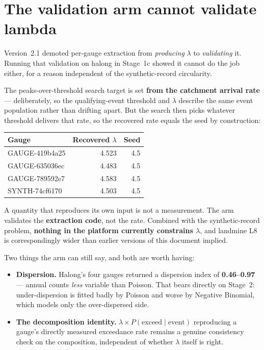 \documentclass[11pt]{article}
\begin{document}
\section{The validation arm cannot validate lambda}
\label{sec:circular2}

Version~2.1 demoted per-gauge extraction from \emph{producing} $\lambda$ to
\emph{validating} it. Running that validation on halong in Stage~1c showed it
cannot do the job either, for a reason independent of the synthetic-record
circularity.

The peaks-over-threshold search target is set \textbf{from the catchment arrival
rate} --- deliberately, so the qualifying-event threshold and $\lambda$ describe
the same event population rather than drifting apart. But the search then picks
whatever threshold delivers that rate, so the recovered rate equals the seed by
construction:

\begin{center}
\begin{tabular}{@{}lrr@{}}
\toprule
\textbf{Gauge} & \textbf{Recovered $\lambda$} & \textbf{Seed} \\
\midrule
GAUGE-419b4a25 & 4.523 & 4.5 \\
GAUGE-635036ec & 4.483 & 4.5 \\
GAUGE-789592e7 & 4.583 & 4.5 \\
SYNTH-74cf6170 & 4.503 & 4.5 \\
\bottomrule
\end{tabular}
\end{center}

\noindent A quantity that reproduces its own input is not a measurement. The arm
validates the \textbf{extraction code}, not the rate. Combined with the
synthetic-record problem, \textbf{nothing in the platform currently constrains
$\lambda$}, and landmine L8 is correspondingly wider than earlier versions of
this document implied.

Two things the arm can still say, and both are worth having:

\begin{itemize}[nosep]
  \item \textbf{Dispersion.} Halong's four gauges returned a dispersion index of
        \textbf{0.46--0.97} --- annual counts \emph{less} variable than Poisson.
        That bears directly on Stage~2: under-dispersion is fitted badly by
        Poisson and worse by Negative Binomial, which models only the
        over-dispersed side.
  \item \textbf{The decomposition identity.} $\lambda \times P(\text{exceed}
        \mid \text{event})$ reproducing a gauge's directly measured exceedance
        rate remains a genuine consistency check on the composition,
        independent of whether $\lambda$ itself is right.
\end{itemize}
\end{document}
